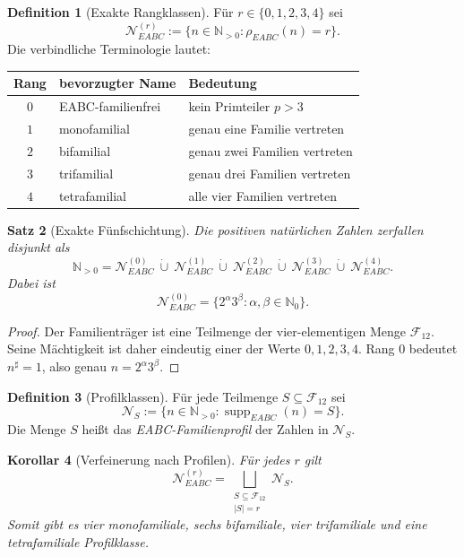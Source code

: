 \documentclass[11pt,a4paper,reqno]{amsart}
\newtheorem{theorem}{Satz}[section]
\newtheorem{corollary}[theorem]{Korollar}
\theoremstyle{definition}
\newtheorem{definition}[theorem]{Definition}
\theoremstyle{remark}
\newcommand{\Npos}{\mathbb{N}_{>0}}
\newcommand{\Fam}{\mathcal{F}_{12}}
\newcommand{\suppE}{\operatorname{supp}_{EABC}}
\newcommand{\rankE}{\rho_{EABC}}
\newcommand{\dotcupsmall}{\mathbin{\dot\cup}}
\begin{document}
\begin{definition}[Exakte Rangklassen]
Für $r\in\{0,1,2,3,4\}$ sei
\[
\mathcal N^{(r)}_{EABC}:=\{n\in\Npos:\rankE(n)=r\}.
\]
Die verbindliche Terminologie lautet:
\begin{center}
\begin{tabular}{cll}
\toprule
Rang & bevorzugter Name & Bedeutung \\
\midrule
$0$ & EABC-familienfrei & kein Primteiler $p>3$ \\
$1$ & monofamilial & genau eine Familie vertreten \\
$2$ & bifamilial & genau zwei Familien vertreten \\
$3$ & trifamilial & genau drei Familien vertreten \\
$4$ & tetrafamilial & alle vier Familien vertreten \\
\bottomrule
\end{tabular}
\end{center}
\end{definition}

\begin{theorem}[Exakte Fünfschichtung]
Die positiven natürlichen Zahlen zerfallen disjunkt als
\[
\Npos
=\mathcal N^{(0)}_{EABC}\ \dotcupsmall\
 \mathcal N^{(1)}_{EABC}\ \dotcupsmall\
 \mathcal N^{(2)}_{EABC}\ \dotcupsmall\
 \mathcal N^{(3)}_{EABC}\ \dotcupsmall\
 \mathcal N^{(4)}_{EABC}.
\]
Dabei ist
\[
\mathcal N^{(0)}_{EABC}
=\{2^\alpha3^\beta:\alpha,\beta\in\mathbb N_0\}.
\]
\end{theorem}

\begin{proof}
Der Familienträger ist eine Teilmenge der vier-elementigen Menge $\Fam$. Seine Mächtigkeit ist daher eindeutig einer der Werte $0,1,2,3,4$. Rang $0$ bedeutet $n^{\sharp}=1$, also genau $n=2^\alpha3^\beta$.
\end{proof}

\begin{definition}[Profilklassen]
Für jede Teilmenge $S\subseteq\Fam$ sei
\[
\mathcal N_S:=\{n\in\Npos:\suppE(n)=S\}.
\]
Die Menge $S$ heißt das \emph{EABC-Familienprofil} der Zahlen in $\mathcal N_S$.
\end{definition}

\begin{corollary}[Verfeinerung nach Profilen]
Für jedes $r$ gilt
\[
\mathcal N^{(r)}_{EABC}
=\bigsqcup_{\substack{S\subseteq\Fam\\|S|=r}}\mathcal N_S.
\]
Somit gibt es vier monofamiliale, sechs bifamiliale, vier trifamiliale und eine tetrafamiliale Profilklasse.
\end{corollary}
\end{document}
